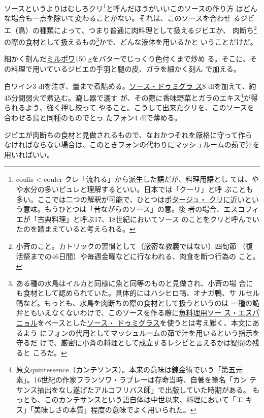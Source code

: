 \begin{recette}
ソースというよりはむしろクリ\footnote{coulis \textless{} couler
  クレ「流れる」から派生した語だが、料理用語とし
  ては、やや水分の多いピュレと理解するといい。日本では「クーリ」と呼
  ぶことも多い。ここでは二つの解釈が可能で、ひとつは\protect\hyperlink{}{ポタージュ・
  クリ}に近いという意味。もうひとつは「昔ながらのソース」の意。後
  者の場合、エスコフィエが「古典料理」と呼ぶ17、18世紀においてソース
  のことをクリと呼んでいたのを踏まえていると考えられる。}と呼んだほうがいいこのソースの作り方
はどんな場合も一点を除いて変わることがない。それは、このソースを合わせ
るジビエ（鳥）の種類によって、つまり普通に肉料理として扱えるジビエか、
肉断ち\footnote{小斉のこと。カトリックの習慣として（厳密な教義ではない）四旬節
  （復活祭までの46日間）や毎週金曜などに行なわれる、肉食を断つ行為の
  こと。}の際の食材として扱えるもの\footnote{ある種の水鳥はイルカと同様に魚と同等のものと見做され、小斉の場
  合にも食材として認められていた。具体的にはハシヒロ鴨、オナガ鴨、サ
  ルセル鴨など。もっとも、水鳥を肉断ちの際の食材として扱うというのは
  一種の詭弁ともいえなくないわけで、このソースを作る際に\protect\hyperlink{sauce-espagnole-maigre}{魚料理用ソー
  ス・エスパニョル}をベースとした\protect\hyperlink{sauce-demi-glace}{ソース・
  ドゥミグラス}を使うとは考え難く、本文にあるよう
  にフォンの代用としてマッシュルームの茹で汁を用いるという指示を守るだ
  けで、厳密に小斉の料理として成立するレシピと言えるかは疑問の残ると
  ころだ。}かで、どんな液体を用いるかと いうことだけだ。

細かく刻んだ\protect\hyperlink{mirepoix}{ミルポワ}150
gをバターでじっくり色付くまで炒め
る。そこに、その料理で用いているジビエの手羽と腿の皮、ガラを細かく刻ん
で加える。

白ワイン3
dlを注ぎ、\untiers{}量まで煮詰める。\protect\hyperlink{sauce-demi-glace}{ソース・ドゥミグラ
ス}8 dlを加えて、約45分間弱火で煮込む。漉し器で漉す
が、その際に香味野菜とガラのエキス\footnote{原文quintessence（カンテソンス）。本来の意味は錬金術でいう「第五元
  素」。16世紀の作家フランソワ・ラブレーは存命当時、自著を筆名「カン
  テサンス抽出をなし遂げたアルコフリバス師」で出版していた時期がある。
  もっとも、このカンテサンスという語自体は中世以来、料理において「エ
  キス」「美味しさの本質」程度の意味でよく用いられた。}が得られるよう、強く押し絞って
やること。こうして出来たクリを、このソースを合わせる鳥と同種のものでとっ
たフォン4 dlで薄める。

ジビエが肉断ちの食材と見做されるもので、なおかつそれを厳格に守って作ら
なければならない場合は、このときフォンの代わりにマッシュルームの茹で汁を
用いればいい。


\end{recette}
